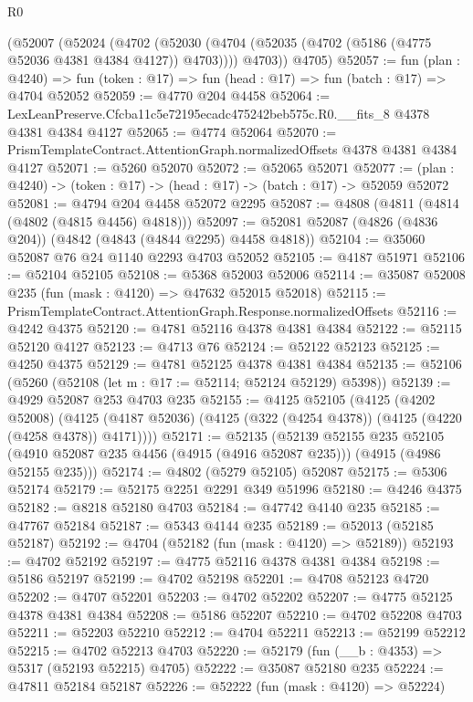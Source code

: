 \begin{lexlean}{R0}
\begin{coremodule}
    (@52007
      (@52024
        (@4702
          (@52030 (@4704 (@52035 (@4702 (@5186 (@4775 @52036 @4381 @4384 @4127)) @4703))))
          @4703))
      @4705)
@52057 := fun (plan : @4240) =>
  fun (token : @17) => fun (head : @17) => fun (batch : @17) => @4704 @52052
@52059 := @4770 @204 @4458
@52064 := LexLeanPreserve.Cfcba11c5e72195ecadc475242beb575c.R0.__fits_8 @4378 @4381 @4384 @4127
@52065 := @4774 @52064
@52070 := PrismTemplateContract.AttentionGraph.normalizedOffsets @4378 @4381 @4384 @4127
@52071 := @5260 @52070
@52072 := @52065 @52071
@52077 := (plan : @4240) -> (token : @17) -> (head : @17) -> (batch : @17) -> @52059 @52072
@52081 := @4794 @204 @4458 @52072 @2295
@52087 := @4808 (@4811 (@4814 (@4802 (@4815 @4456) @4818)))
@52097 := @52081 @52087 (@4826 (@4836 @204)) (@4842 (@4843 (@4844 @2295) @4458 @4818))
@52104 := @35060 @52087 @76 @24 @1140 @2293 @4703 @52052
@52105 := @4187 @51971
@52106 := @52104 @52105
@52108 := @5368 @52003 @52006
@52114 := @35087 @52008 @235 (fun (mask : @4120) => @47632 @52015 @52018)
@52115 := PrismTemplateContract.AttentionGraph.Response.normalizedOffsets
@52116 := @4242 @4375
@52120 := @4781 @52116 @4378 @4381 @4384
@52122 := @52115 @52120 @4127
@52123 := @4713 @76
@52124 := @52122 @52123
@52125 := @4250 @4375
@52129 := @4781 @52125 @4378 @4381 @4384
@52135 := @52106 (@5260 (@52108 (let m : @17 := @52114; @52124 @52129) @5398))
@52139 := @4929 @52087 @253 @4703 @235
@52155 := @4125
    @52105
    (@4125
      (@4202 @52008)
      (@4125 (@4187 @52036) (@4125 (@322 (@4254 @4378)) (@4125 (@4220 (@4258 @4378)) @4171))))
@52171 := @52135
    (@52139
      @52155
      @235
      @52105
      (@4910 @52087 @235 @4456 (@4915 (@4916 @52087 @235)))
      (@4915 (@4986 @52155 @235)))
@52174 := @4802 (@5279 @52105) @52087
@52175 := @5306 @52174
@52179 := @52175 @2251 @2291 @349 @51996
@52180 := @4246 @4375
@52182 := @8218 @52180 @4703
@52184 := @47742 @4140 @235
@52185 := @47767 @52184
@52187 := @5343 @4144 @235
@52189 := @52013 (@52185 @52187)
@52192 := @4704 (@52182 (fun (mask : @4120) => @52189))
@52193 := @4702 @52192
@52197 := @4775 @52116 @4378 @4381 @4384
@52198 := @5186 @52197
@52199 := @4702 @52198
@52201 := @4708 @52123 @4720
@52202 := @4707 @52201
@52203 := @4702 @52202
@52207 := @4775 @52125 @4378 @4381 @4384
@52208 := @5186 @52207
@52210 := @4702 @52208 @4703
@52211 := @52203 @52210
@52212 := @4704 @52211
@52213 := @52199 @52212
@52215 := @4702 @52213 @4703
@52220 := @52179 (fun (__b : @4353) => @5317 (@52193 @52215) @4705)
@52222 := @35087 @52180 @235
@52224 := @47811 @52184 @52187
@52226 := @52222 (fun (mask : @4120) => @52224)

\end{coremodule}
\end{lexlean}
